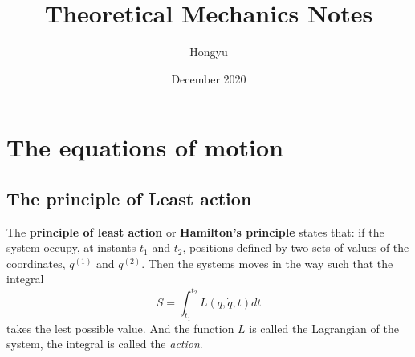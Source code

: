 \documentclass{article}
\title{Theoretical Mechanics Notes}
\author{Hongyu}
\date{December 2020}
\begin{document}
\maketitle

\section{The equations of motion}
\subsection{The principle of Least action}
The \textbf{principle of least action} or \textbf{Hamilton's principle} states that: if the system occupy, at instants $t_1$ and $t_2$, positions defined by two sets of values of the coordinates, $q^(1)$ and $q^(2)$. Then the systems moves in the way such that the integral \begin{equation}
    S = \int_{t_1}^{t_2}L(q,\dot q,t)dt
\end{equation} takes the lest possible value. And the function $L$ is called the Lagrangian of the system, the integral is called the \textit{action}.
\end{document}
